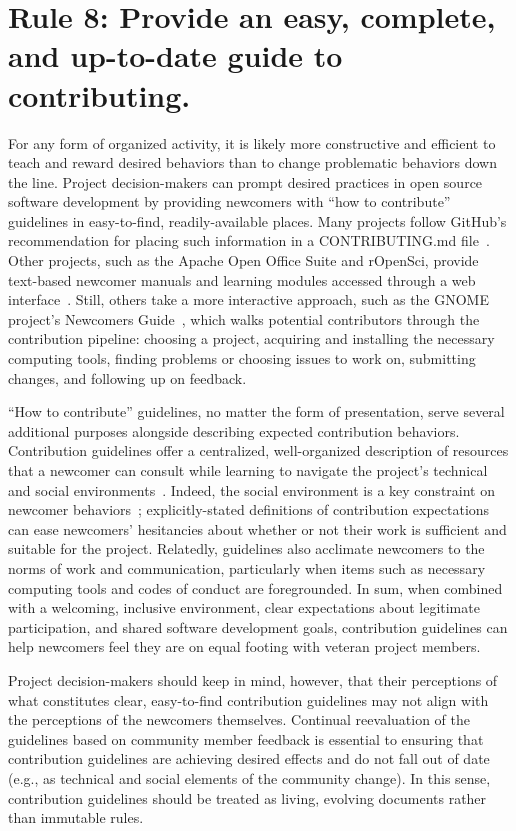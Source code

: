 \documentclass[10pt,letterpaper]{article}
\newcommand{\rulemajor}[1]{\section*{#1}}
\begin{document}
\rulemajor{Rule 8: Provide an easy, complete, and up-to-date guide to contributing.}

For any form of organized activity,
it is likely more constructive and efficient to teach and reward desired behaviors than to change problematic behaviors down the line.
Project decision-makers can prompt desired practices in open source software development
by providing newcomers with ``how to contribute'' guidelines in easy-to-find, readily-available places.
Many projects follow GitHub's recommendation for placing such information in a CONTRIBUTING.md file~\cite{github-rec}.
Other projects,
such as the Apache Open Office Suite and rOpenSci,
provide text-based newcomer manuals and learning modules accessed through a web interface~\cite{apache-guidelines,ropensci-guidelines}.
Still, others take a more interactive approach,
such as the GNOME project's Newcomers Guide~\cite{gnome-newcomers},
which walks potential contributors through the contribution pipeline:
choosing a project,
acquiring and installing the necessary computing tools,
finding problems or choosing issues to work on,
submitting changes,
and following up on feedback.

``How to contribute'' guidelines,
no matter the form of presentation,
serve several additional purposes alongside describing expected contribution behaviors.
Contribution guidelines offer a centralized, well-organized description of resources
that a newcomer can consult while learning to navigate the project's technical and social environments~\cite{zanatta2017}.
Indeed, the social environment is a key constraint on newcomer behaviors~\cite{steinmacher2015};
explicitly-stated definitions of contribution expectations can ease newcomers' hesitancies
about whether or not their work is sufficient and suitable for the project.
Relatedly,
guidelines also acclimate newcomers to the norms of work and communication,
particularly when items such as necessary computing tools and codes of conduct are foregrounded.
In sum,
when combined with a welcoming, inclusive environment,
clear expectations about legitimate participation,
and shared software development goals,
contribution guidelines can help newcomers feel they are on equal footing with veteran project members.

Project decision-makers should keep in mind, however, 
that their perceptions of what constitutes clear, easy-to-find contribution guidelines
may not align with the perceptions of the newcomers themselves.
Continual reevaluation of the guidelines based on community member feedback is essential
to ensuring that contribution guidelines are achieving desired effects
and do not fall out of date (e.g., as technical and social elements of the community change).
In this sense,
contribution guidelines should be treated as living, evolving documents rather than immutable rules.
\end{document}
